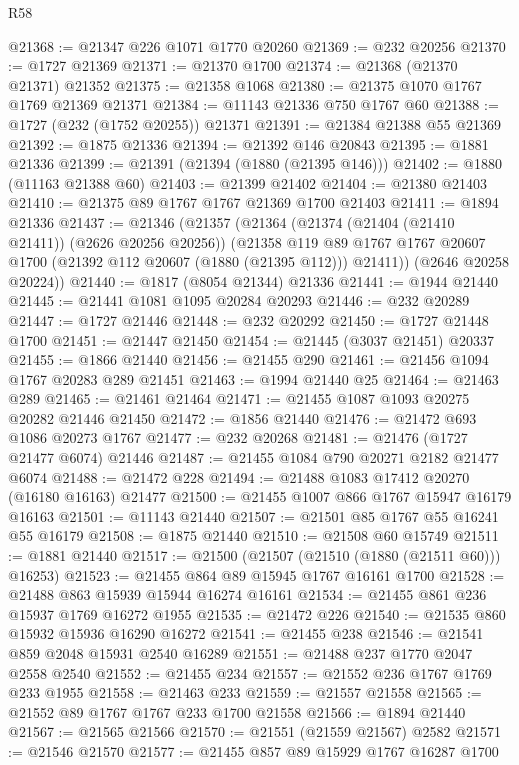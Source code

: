 \begin{lexlean}{R58}
\begin{coremodule}
@21368 := @21347 @226 @1071 @1770 @20260
@21369 := @232 @20256
@21370 := @1727 @21369
@21371 := @21370 @1700
@21374 := @21368 (@21370 @21371) @21352
@21375 := @21358 @1068
@21380 := @21375 @1070 @1767 @1769 @21369 @21371
@21384 := @11143 @21336 @750 @1767 @60
@21388 := @1727 (@232 (@1752 @20255)) @21371
@21391 := @21384 @21388 @55 @21369
@21392 := @1875 @21336
@21394 := @21392 @146 @20843
@21395 := @1881 @21336
@21399 := @21391 (@21394 (@1880 (@21395 @146)))
@21402 := @1880 (@11163 @21388 @60)
@21403 := @21399 @21402
@21404 := @21380 @21403
@21410 := @21375 @89 @1767 @1767 @21369 @1700 @21403
@21411 := @1894 @21336
@21437 := @21346
    (@21357
      (@21364
        (@21374 (@21404 (@21410 @21411)) (@2626 @20256 @20256))
        (@21358
          @119
          @89
          @1767
          @1767
          @20607
          @1700
          (@21392 @112 @20607 (@1880 (@21395 @112)))
          @21411))
      (@2646 @20258 @20224))
@21440 := @1817 (@8054 @21344) @21336
@21441 := @1944 @21440
@21445 := @21441 @1081 @1095 @20284 @20293
@21446 := @232 @20289
@21447 := @1727 @21446
@21448 := @232 @20292
@21450 := @1727 @21448 @1700
@21451 := @21447 @21450
@21454 := @21445 (@3037 @21451) @20337
@21455 := @1866 @21440
@21456 := @21455 @290
@21461 := @21456 @1094 @1767 @20283 @289 @21451
@21463 := @1994 @21440 @25
@21464 := @21463 @289
@21465 := @21461 @21464
@21471 := @21455 @1087 @1093 @20275 @20282 @21446 @21450
@21472 := @1856 @21440
@21476 := @21472 @693 @1086 @20273 @1767
@21477 := @232 @20268
@21481 := @21476 (@1727 @21477 @6074) @21446
@21487 := @21455 @1084 @790 @20271 @2182 @21477 @6074
@21488 := @21472 @228
@21494 := @21488 @1083 @17412 @20270 (@16180 @16163) @21477
@21500 := @21455 @1007 @866 @1767 @15947 @16179 @16163
@21501 := @11143 @21440
@21507 := @21501 @85 @1767 @55 @16241 @55 @16179
@21508 := @1875 @21440
@21510 := @21508 @60 @15749
@21511 := @1881 @21440
@21517 := @21500 (@21507 (@21510 (@1880 (@21511 @60))) @16253)
@21523 := @21455 @864 @89 @15945 @1767 @16161 @1700
@21528 := @21488 @863 @15939 @15944 @16274 @16161
@21534 := @21455 @861 @236 @15937 @1769 @16272 @1955
@21535 := @21472 @226
@21540 := @21535 @860 @15932 @15936 @16290 @16272
@21541 := @21455 @238
@21546 := @21541 @859 @2048 @15931 @2540 @16289
@21551 := @21488 @237 @1770 @2047 @2558 @2540
@21552 := @21455 @234
@21557 := @21552 @236 @1767 @1769 @233 @1955
@21558 := @21463 @233
@21559 := @21557 @21558
@21565 := @21552 @89 @1767 @1767 @233 @1700 @21558
@21566 := @1894 @21440
@21567 := @21565 @21566
@21570 := @21551 (@21559 @21567) @2582
@21571 := @21546 @21570
@21577 := @21455 @857 @89 @15929 @1767 @16287 @1700

\end{coremodule}
\end{lexlean}
